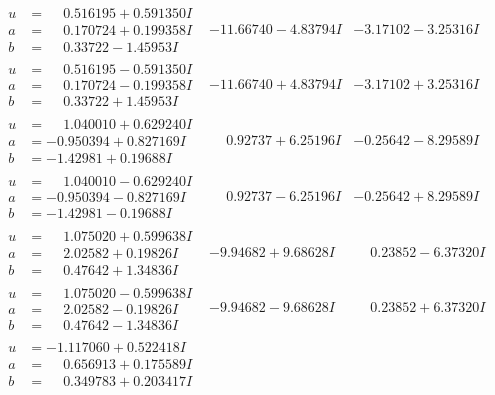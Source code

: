 \documentclass[1p]{elsarticle_modified}
\theoremstyle{definition}
\begin{document}
$$\begin{array}{c|c|c}
\begin{aligned}
u &= \phantom{-}0.516195 + 0.591350 I \\
a &= \phantom{-}0.170724 + 0.199358 I \\
b &= \phantom{-}0.33722 - 1.45953 I\end{aligned}
 & -11.66740 - 4.83794 I & -3.17102 - 3.25316 I \\ \hline\begin{aligned}
u &= \phantom{-}0.516195 - 0.591350 I \\
a &= \phantom{-}0.170724 - 0.199358 I \\
b &= \phantom{-}0.33722 + 1.45953 I\end{aligned}
 & -11.66740 + 4.83794 I & -3.17102 + 3.25316 I \\ \hline\begin{aligned}
u &= \phantom{-}1.040010 + 0.629240 I \\
a &= -0.950394 + 0.827169 I \\
b &= -1.42981 + 0.19688 I\end{aligned}
 & \phantom{-}0.92737 + 6.25196 I & -0.25642 - 8.29589 I \\ \hline\begin{aligned}
u &= \phantom{-}1.040010 - 0.629240 I \\
a &= -0.950394 - 0.827169 I \\
b &= -1.42981 - 0.19688 I\end{aligned}
 & \phantom{-}0.92737 - 6.25196 I & -0.25642 + 8.29589 I \\ \hline\begin{aligned}
u &= \phantom{-}1.075020 + 0.599638 I \\
a &= \phantom{-}2.02582 + 0.19826 I \\
b &= \phantom{-}0.47642 + 1.34836 I\end{aligned}
 & -9.94682 + 9.68628 I & \phantom{-}0.23852 - 6.37320 I \\ \hline\begin{aligned}
u &= \phantom{-}1.075020 - 0.599638 I \\
a &= \phantom{-}2.02582 - 0.19826 I \\
b &= \phantom{-}0.47642 - 1.34836 I\end{aligned}
 & -9.94682 - 9.68628 I & \phantom{-}0.23852 + 6.37320 I \\ \hline\begin{aligned}
u &= -1.117060 + 0.522418 I \\
a &= \phantom{-}0.656913 + 0.175589 I \\
b &= \phantom{-}0.349783 + 0.203417 I\end{aligned}

\end{array}$$
\end{document}

